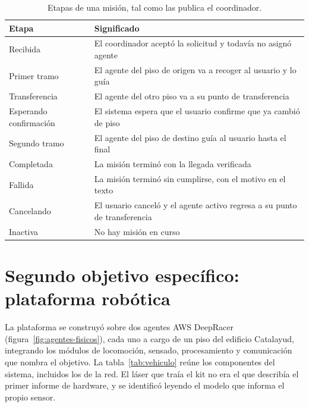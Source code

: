 \begin{table}[H]
  \centering\footnotesize{}
  \caption{Etapas de una misión, tal como las publica el coordinador.}
  \label{tab:etapas-mision}
  \begin{tabular}{@{}>{\raggedright\arraybackslash}p{}>{\raggedright\arraybackslash}p{}@{}}
    \toprule
    \textbf{Etapa} & \textbf{Significado} \\ \midrule
    Recibida & El coordinador aceptó la solicitud y todavía no asignó agente \\
    Primer tramo & El agente del piso de origen va a recoger al usuario y lo guía \\
    Transferencia & El agente del otro piso va a su punto de transferencia \\
    Esperando confirmación & El sistema espera que el usuario confirme que ya cambió de piso \\
    Segundo tramo & El agente del piso de destino guía al usuario hasta el final \\
    Completada & La misión terminó con la llegada verificada \\
    Fallida & La misión terminó sin cumplirse, con el motivo en el texto \\
    Cancelando & El usuario canceló y el agente activo regresa a su punto de transferencia \\
    Inactiva & No hay misión en curso \\ \bottomrule
  \end{tabular}
\end{table}

\section{Segundo objetivo específico: plataforma robótica}
\label{sec:plataforma}

La plataforma se construyó sobre dos agentes AWS DeepRacer (figura~\ref{fig:agentes-fisicos}), cada uno a cargo de un piso del edificio Catalayud, integrando los módulos de locomoción, sensado, procesamiento y comunicación que nombra el objetivo. La tabla~\ref{tab:vehiculo} reúne los componentes del sistema, incluidos los de la red. El láser que traía el kit no era el que describía el primer informe de hardware, y se identificó leyendo el modelo que informa el propio sensor.

